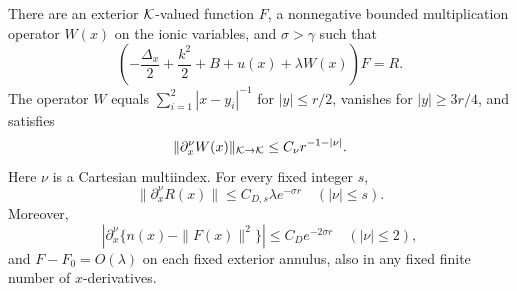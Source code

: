 \begin{lemma}
\label{lem:channel-cutoff}
There are an exterior \(\mathcal K\)-valued function \(F\), a nonnegative bounded
multiplication operator \(W(x)\) on the ionic variables, and
\(\sigma>\gamma\) such that
\begin{equation}
 \left(-\frac{\Delta_x}{2}+\frac{k^2}{2}+B+u(x)+\lambda W(x)\right)F=R.
 \label{eq:cutoff-channel-equation}
\end{equation}
The operator \(W\) equals \(\sum_{i=1}^2|x-y_i|^{-1}\) for
\(|y|\leq r/2\), vanishes for \(|y|\geq3r/4\), and satisfies
\begin{equation}
 \|\partial_x^\nu W(x)\|_{\mathcal K\to\mathcal K}
 \leq C_\nu r^{-1-|\nu|}.
 \label{eq:cutoff-interaction-symbol}
\end{equation}
Here \(\nu\) is a Cartesian multiindex.  For every fixed integer \(s\),
\begin{equation}
 \|\partial_x^\nu R(x)\|\leq C_{D,s}\lambda e^{-\sigma r}
 \quad(|\nu|\leq s).
 \label{eq:channel-residual}
\end{equation}
Moreover,
\begin{equation}
 \left|\partial_x^\nu\{n(x)-\|F(x)\|^2\}\right|
 \leq C_D e^{-2\sigma r}\quad(|\nu|\leq2),
 \label{eq:density-cutoff-error}
\end{equation}
and \(F-F_0=O(\lambda)\) on each fixed exterior annulus, also in any
fixed finite number of \(x\)-derivatives.
\end{lemma}

